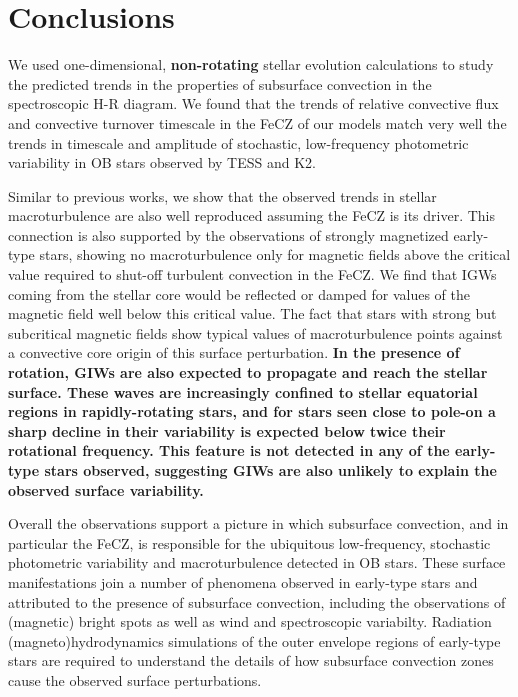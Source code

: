 \documentclass[twocolumn]{aastex63}
\begin{document}
\section{Conclusions}

We used one-dimensional, {\bf non-rotating} stellar evolution calculations  to study the predicted trends in the properties of subsurface convection in the spectroscopic H-R diagram.
We found that the trends of relative convective flux and convective turnover timescale in the FeCZ of our models match very well the trends in timescale 
and amplitude of stochastic, low-frequency  photometric variability in OB stars observed by TESS and K2.


Similar to previous works, we  show that the observed trends in stellar macroturbulence are also well reproduced assuming the FeCZ is its driver. This connection is also supported by the observations of strongly magnetized early-type stars,
showing no macroturbulence only for magnetic fields above the critical value required to shut-off turbulent convection in the FeCZ. We find that IGWs coming from the stellar core would be reflected or damped for values of the magnetic field well below this critical value. The fact that stars with strong but subcritical magnetic fields show typical values of macroturbulence points against a convective core origin of this surface perturbation. 
{\bf  In the presence of rotation, GIWs are also expected to propagate and reach the stellar surface. These waves are increasingly confined to stellar equatorial regions in rapidly-rotating stars, and for stars seen close to pole-on a  sharp decline in their variability is expected below twice their rotational frequency. This feature is not detected in any of the early-type stars observed, suggesting GIWs are also unlikely to explain the observed surface variability.}

Overall the observations support a picture in which subsurface convection, and in particular the FeCZ, is responsible for the ubiquitous low-frequency, stochastic photometric variability and macroturbulence detected in OB stars. 
These surface manifestations join a number of phenomena observed in early-type stars and attributed to the presence of subsurface convection, including the observations of (magnetic) bright spots as well as wind and spectroscopic variabilty. Radiation (magneto)hydrodynamics simulations of the outer envelope regions of early-type stars are required to understand the details of how  subsurface convection zones cause the observed surface perturbations.
\end{document}

